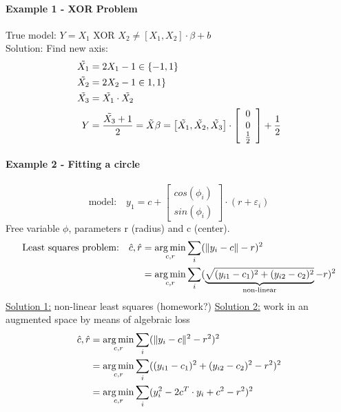 \documentclass[11pt]{article}
\DeclareMathOperator*{\argmin}{arg\,min}
\DeclarePairedDelimiter\norm{\lVert}{\rVert}
\begin{document}
    \paragraph{Example 1 - XOR Problem}
    True model: $Y=X_1$ XOR $X_2 \neq [X_1, X_2]\cdot \beta+b$ \\
    Solution: Find new axis:
    \begin{equation*}
      \begin{align*}
        \tilde{X_1} &= 2X_1-1 \in \{ -1,1\} \\
        \tilde{X_2} &= 2X_2-1 \in \-1, 1\} \\
        \tilde{X_3} &= \tilde{X_1} \cdot \tilde{X_2} \\
        Y &= \frac{\tilde{X_3}+1}{2} = \tilde{X}\beta = \left[ \tilde{X_1}, \tilde{X_2}, \tilde{X_3}\right] \cdot
        \left[ \begin{array}{c}
        0 \\
        0 \\
        \frac{1}{2} \\
        \end{array}
        \right] + \frac{1}{2}
      \end{align*}
    \end{equation*}
    \noindent \paragraph{Example 2 - Fitting a circle}
    \begin{equation*}
      \text{model:} \quad y_1 = c+ \left[ \begin{array}{c} cos(\phi_i) \\ sin(\phi_i)
      \end{array} \right] \cdot (r+\varepsilon_i)
    \end{equation*}
    Free variable $\phi$, parameters r (radius) and c (center).
    \begin{equation*}
      \begin{align*}
      \text{Least squares problem:} \quad \hat{c}, \hat{r}&=\argmin_{c,r} \sum_i
      (\norm{y_i-c}-r)^2 \\ &=\argmin_{c,r} \sum_i (\underbrace{\sqrt{(y_{i1}-c_1)^2+(y_
      {i2}-c_2)^2}}_{\text{non-linear}}-r)^2
      \end{align*}
    \end{equation*}
    \underline{Solution 1:} non-linear least squares (homework?)
    \underline{Solution 2:} work in an augmented space by means of algebraic loss
    \begin{equation*}
      \begin{align*}
        \hat{c}, \hat{r}&=\argmin_{c,r} \sum_i (\norm{y_i-c}^2-r^2)^2 \\
        &= \argmin_{c,r} \sum_i ((y_{i1}-c_1)^2+(y_{i2}-c_2)^2-r^2)^2 \\
        &= \argmin_{c,r} \sum_i (y_i^2-2c^T \cdot y_i+c^2-r^2)^2
      \end{align*}
    \end{equation*}
\end{document}
